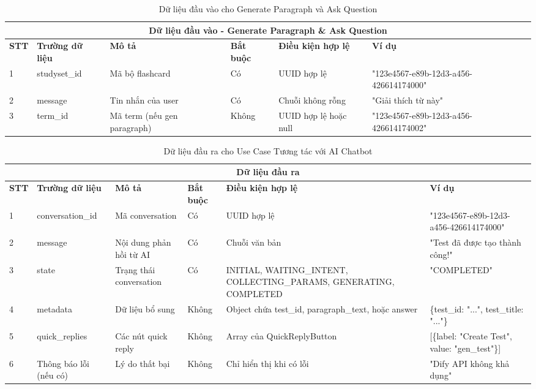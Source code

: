 \documentclass[../DoAn.tex]{subfiles}
\begin{document}
\vspace{0.5cm}

\begin{table}[h!]
\centering
\begin{tabular}{|m{1cm}|m{2.5cm}|m{3cm}|m{1cm}|m{2.5cm}|m{3.5cm}|}
    \hline
    \multicolumn{6}{|c|}{\textbf{Dữ liệu đầu vào - Generate Paragraph \& Ask Question}} \\
    \hline
    \textbf{STT} & \textbf{Trường dữ liệu} & \textbf{Mô tả} & \textbf{Bắt buộc} & \textbf{Điều kiện hợp lệ} & \textbf{Ví dụ} \\
    \hline
    1 & studyset\_id & Mã bộ flashcard & Có & UUID hợp lệ & "123e4567-e89b-12d3-a456-426614174000" \\
    \hline
    2 & message & Tin nhắn của user & Có & Chuỗi không rỗng & "Giải thích từ này" \\
    \hline
    3 & term\_id & Mã term (nếu gen paragraph) & Không & UUID hợp lệ hoặc null & "123e4567-e89b-12d3-a456-426614174002" \\
    \hline
\end{tabular}
\caption{Dữ liệu đầu vào cho Generate Paragraph và Ask Question}
\end{table}

\vspace{0.5cm}

\begin{table}[h!]
\centering
\begin{tabular}{|m{1cm}|m{2.5cm}|m{3cm}|m{1cm}|m{2.5cm}|m{3.5cm}|}
    \hline
    \multicolumn{6}{|c|}{\textbf{Dữ liệu đầu ra}} \\
    \hline
    \textbf{STT} & \textbf{Trường dữ liệu} & \textbf{Mô tả} & \textbf{Bắt buộc} & \textbf{Điều kiện hợp lệ} & \textbf{Ví dụ} \\
    \hline
    1 & conversation\_id & Mã conversation & Có & UUID hợp lệ & "123e4567-e89b-12d3-a456-426614174000" \\
    \hline
    2 & message & Nội dung phản hồi từ AI & Có & Chuỗi văn bản & "Test đã được tạo thành công!" \\
    \hline
    3 & state & Trạng thái conversation & Có & INITIAL, WAITING\_INTENT, COLLECTING\_PARAMS, GENERATING, COMPLETED & "COMPLETED" \\
    \hline
    4 & metadata & Dữ liệu bổ sung & Không & Object chứa test\_id, paragraph\_text, hoặc answer & \{test\_id: "...", test\_title: "..."\} \\
    \hline
    5 & quick\_replies & Các nút quick reply & Không & Array của QuickReplyButton & [\{label: "Create Test", value: "gen\_test"\}] \\
    \hline
    6 & Thông báo lỗi (nếu có) & Lý do thất bại & Không & Chỉ hiển thị khi có lỗi & "Dify API không khả dụng" \\
    \hline
\end{tabular}
\caption{Dữ liệu đầu ra cho Use Case Tương tác với AI Chatbot}
\end{table}
\end{document}
